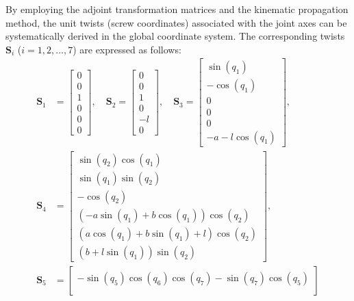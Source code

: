 \documentclass[a4paper,fleqn]{cas-sc}
\begin{document}
By employing the adjoint transformation matrices and the kinematic propagation method, the unit twists (screw coordinates) associated with the joint axes can be systematically derived in the global coordinate system. The corresponding twists $\boldsymbol{S}_i$ ($i = 1, 2, \dots, 7$) are expressed as follows:
\begin{equation}
\begin{aligned}
    \boldsymbol{S}_1 &= \begin{bmatrix}0\\0\\1\\0\\0\\0\end{bmatrix}, \quad
    \boldsymbol{S}_2 = \begin{bmatrix}0\\0\\1\\0\\- l\\0\end{bmatrix}, \quad
    \boldsymbol{S}_3 = \begin{bmatrix}\sin{\left(q_{1} \right)}\\- \cos{\left(q_{1} \right)}\\0\\0\\0\\- a - l \cos{\left(q_{1} \right)}\end{bmatrix}, \\
    \boldsymbol{S}_4 &= \begin{bmatrix}\sin{\left(q_{2} \right)} \cos{\left(q_{1} \right)}\\\sin{\left(q_{1} \right)} \sin{\left(q_{2} \right)}\\- \cos{\left(q_{2} \right)}\\\left(- a \sin{\left(q_{1} \right)} + b \cos{\left(q_{1} \right)}\right) \cos{\left(q_{2} \right)}\\\left(a \cos{\left(q_{1} \right)} + b \sin{\left(q_{1} \right)} + l\right) \cos{\left(q_{2} \right)}\\\left(b + l \sin{\left(q_{1} \right)}\right) \sin{\left(q_{2} \right)}\end{bmatrix}, \\
    \boldsymbol{S}_5 &= \begin{bmatrix}
        - \sin{\left(q_{5} \right)} \cos{\left(q_{6} \right)} \cos{\left(q_{7} \right)} - \sin{\left(q_{7} \right)} \cos{\left(q_{5} \right)} \\

\end{bmatrix}
\end{aligned}
\end{equation}
\end{document}
